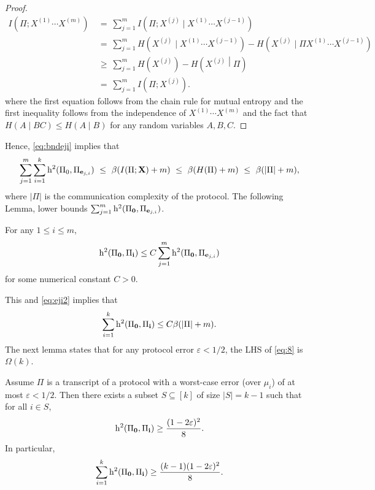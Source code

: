 \begin{proof}
\begin{align*}
I\left(\Pi; X^{(1)} \cdots X^{(m)}\right)
&~=~ \sum_{j=1}^m I\left(\Pi; X^{(j)} \mid X^{(1)} \cdots X^{(j-1)}\right) \\
&~=~ \sum_{j=1}^m H\left(X^{(j)} \mid X^{(1)} \cdots X^{(j-1)}\right) - H\left(X^{(j)}  \mid \Pi X^{(1)} \cdots X^{(j-1)}\right) \\
&~\ge~ \sum_{j=1}^m H\left(X^{(j)}\right) - H\left(X^{(j)}  \middle| \Pi\right) \\
&~=~ \sum_{j=1}^m I\left(\Pi; X^{(j)}\right).
\end{align*}
where the first equation follows from the chain rule for mutual entropy and the first inequality follows from the independence of $X^{(1)}\cdots X^{(m)}$ and the fact that $H(A\mid BC) \le H(A \mid B)$ for any random variables $A,B,C$.
\end{proof}
Hence, \eqref{eq:bndeji} implies that
\begin{equation} \label{eq:eji2}
\sum_{j=1}^m \sum_{i=1}^k \mathrm{h}^2(\Pi_0, \Pi_{\mathbf{e}_{j,i}})
~\le~ \beta (I(\Pi ;  \mathbf{X}) + m) 
~\le~ \beta (H(\Pi) + m)
~\le~ \beta (\lvert \Pi \rvert + m),
\end{equation}
where $\lvert \Pi \rvert$ is the communication complexity of the protocol. The following Lemma, \citet[Lemma~2]{braverman2016communication} lower bounds $\sum_{j=1}^m \mathrm{h}^2(\Pi_\mathbf{0}, \Pi_{\mathbf{e}_{j,i}})$.

\begin{lemma}
For any $1 \le i \le m$,
\[
\mathrm{h}^2(\Pi_{\mathbf{0}}, \Pi_{\mathbf{i}})
\le C \sum_{j=1}^m \mathrm{h}^2(\Pi_{\mathbf{0}}, \Pi_{\mathbf{e}_{j,i}})
\]
for some numerical constant $C > 0$.
\end{lemma}

This and \eqref{eq:eji2} implies that
\begin{equation} \label{eq:8}
\sum_{i=1}^k \mathrm{h}^2(\Pi_{\mathbf{0}}, \Pi_{\mathbf{i}})
\le C \beta( \lvert \Pi \rvert + m).
\end{equation}
The next lemma states that for any protocol error $\varepsilon<1/2$, the LHS of \eqref{eq:8} is $\Omega(k)$.

\begin{lemma} \label{lem:err-small}
Assume $\Pi$ is a transcript of a protocol with a worst-case error (over $\mu_i$) of at most $\varepsilon < 1/2$. Then there exists a subset $S \subseteq [k]$ of size $\lvert S \rvert = k-1$ such that for all $i \in S$,
\[
\mathrm{h}^2(\Pi_{\mathbf{0}}, \Pi_{\mathbf{i}}) \ge \frac{(1-2\varepsilon)^2}{8}.
\]
In particular,
\[
\sum_{i=1}^k \mathrm{h}^2(\Pi_{\mathbf{0}}, \Pi_{\mathbf{i}}) \ge \frac{(k-1)(1-2\varepsilon)^2}{8}.
\]
\end{lemma}

